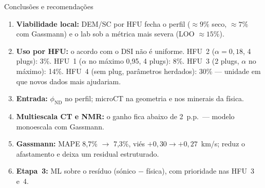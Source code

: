 \documentclass[aspectratio=169,10pt]{beamer}
\newcommand{\phiND}{\ensuremath{\phi_{\mathrm{ND}}}}
\begin{document}
\begin{frame}{Conclusões e recomendações}
  \footnotesize
  \begin{enumerate}
    \item \textbf{Viabilidade local:} DEM/SC por HFU fecha o perfil
          ($\approx 9\%$ seco, $\approx 7\%$ com Gassmann) e o lab sob a
          métrica mais severa (LOO $\approx 15\%$).
    \item \textbf{Uso por HFU:} o acordo com o DSI não é uniforme.
          HFU~2 ($\alpha=0{,}18$, 4 plugs): 3\%.
          HFU~1 ($\alpha$ no máximo 0,95, 4 plugs): 8\%.
          HFU~3 (2 plugs, $\alpha$ no máximo): 14\%.
          HFU~4 (sem plug, parâmetros herdados): 30\% ---
          unidade em que novos dados mais ajudariam.
    \item \textbf{Entrada:} \phiND{} no perfil; microCT na geometria e nos
          minerais da física.
    \item \textbf{Multiescala CT e NMR:} o ganho fica abaixo de 2~p.p.\ ---
          modelo monoescala com Gassmann.
    \item \textbf{Gassmann:} MAPE 8,7\% $\rightarrow$ 7,3\%, viés
          $+0{,}30 \rightarrow +0{,}27$~km/s; reduz o afastamento e deixa
          um residual estruturado.
    \item \textbf{Etapa~3:} ML sobre o resíduo
          (sónico $-$ física), com prioridade nas HFU~3 e~4.
  \end{enumerate}
\end{frame}
\end{document}
